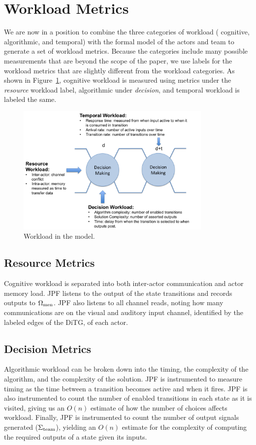 \section{Workload Metrics}
We are now in a position to combine the three categories of workload ( cognitive, algorithmic, and temporal) with the formal model of the actors and team to generate a set of workload metrics.  Because the categories include many possible measurements that are beyond the scope of the paper, we use labels for the workload metrics that are slightly different from the workload categories.  As shown in Figure~\ref{fig:WorkloadMetrics}, cognitive workload is measured using metrics under the {\em resource} workload label, algorithmic under {\em decision}, and temporal workload is labeled the same. 


\begin{figure}[h]
\center
\setlength{\abovecaptionskip}{1mm}
\setlength{\belowcaptionskip}{1mm}
\setlength{\textfloatsep}{1mm}
\setlength{\floatsep}{1mm}
\includegraphics[height=2.5in]{WorkloadMetrics.png}
\caption{Workload in the model.}
\label{fig:WorkloadMetrics}
\end{figure}

\subsection{Resource Metrics}
Cognitive workload is separated into both inter-actor communication and actor memory load. JPF listens to the output of the state transitions and records outputs to $\Omega_{\rm men}$.  JPF also listens to all channel reads, noting how many communications are on the visual and auditory input channel, identified by the labeled edges of the DiTG, of each actor. 


\subsection{Decision Metrics}
Algorithmic workload can be broken down into the timing, the complexity of the algorithm, and the complexity of the solution. JPF is instrumented to measure timing as the time between a transition becomes active and when it fires.  JPF is also instrumented to count the number of enabled transitions in each state as it is visited, giving us an $O(n)$ estimate of how the number of choices affects workload.   Finally, JPF is instrumented to count the number of output signals generated ($\Sigma_{\rm team}$), yielding an $O(n)$ estimate for the complexity of computing the required outputs of a state given its inputs.

